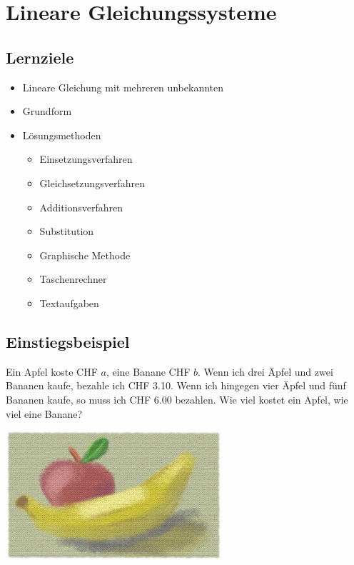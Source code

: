 \section{Lineare Gleichungssysteme}

\subsection*{Lernziele}
\begin{itemize}
	\item{Lineare Gleichung mit mehreren unbekannten}
	\item{Grundform}
	\item{Lösungsmethoden}
	\begin{itemize}
		\item{Einsetzungsverfahren}
		\item{Gleichsetzungsverfahren}
		\item{Additionsverfahren}
		\item{Substitution}
		\item{Graphische Methode}
		\item{Taschenrechner}
    \item Textaufgaben
	\end{itemize}

\end{itemize}

\newpage

\subsection{Einstiegsbeispiel}
Ein Apfel koste CHF $a$, eine Banane CHF $b$. Wenn ich drei Äpfel und zwei Bananen kaufe, bezahle ich CHF 3.10. Wenn ich hingegen vier Äpfel und fünf Bananen kaufe, so muss ich CHF 6.00 bezahlen. Wie viel kostet ein Apfel, wie viel eine Banane?

\begin{center}\includegraphics[width=8cm]{allg/gls/img/ApfelBanane.jpg}\end{center}


